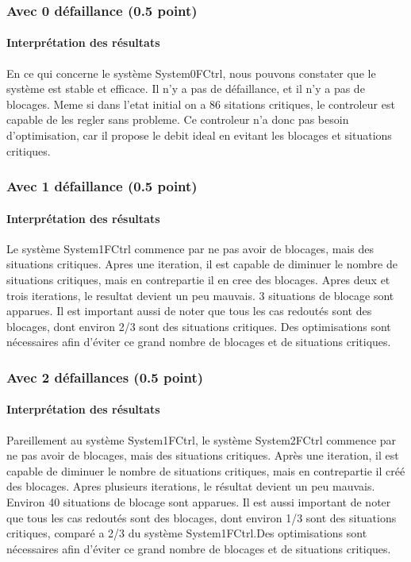 \documentclass[a4paper]{book}
\begin{document}
\subsubsection{Avec 0 défaillance (0.5 point)}

\paragraph{Interprétation des résultats}
En ce qui concerne le système System0FCtrl, nous pouvons constater que le système est
stable et efficace. Il n'y a pas de défaillance, et il n'y a pas de blocages. Meme si dans
l'etat initial on a 86 sitations critiques, le controleur est capable de les regler sans
probleme. Ce controleur n'a donc pas besoin d'optimisation, car il propose le debit ideal
en evitant les blocages et situations critiques.

\subsubsection{Avec 1 défaillance (0.5 point)}

\paragraph{Interprétation des résultats}
Le système System1FCtrl commence par ne pas avoir de blocages, mais des situations critiques.
Apres une iteration, il est capable de diminuer le nombre de situations critiques, mais en
contrepartie il en cree des blocages. Apres deux et trois iterations, le resultat devient
un peu mauvais. 3 situations de blocage sont apparues. Il est important aussi de noter que
tous les cas redoutés sont des blocages, dont environ 2/3 sont des situations critiques.
Des optimisations sont nécessaires afin d'éviter ce grand nombre de blocages et de situations
critiques.


\subsubsection{Avec 2 défaillances (0.5 point)}

\paragraph{Interprétation des résultats}
Pareillement au système System1FCtrl, le système System2FCtrl commence par ne pas avoir de
blocages, mais des situations critiques. Après une iteration, il est capable de diminuer le
nombre de situations critiques, mais en contrepartie il créé des blocages. Apres plusieurs
iterations, le résultat devient un peu mauvais. Environ 40 situations de blocage sont apparues.
Il est aussi important de noter que tous les cas redoutés sont des blocages, dont environ
1/3 sont des situations critiques, comparé a 2/3 du système System1FCtrl.Des optimisations sont
nécessaires afin d'éviter ce grand nombre de blocages et de situations critiques.
\end{document}
